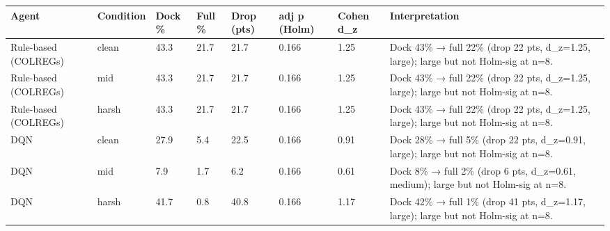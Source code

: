 \begin{tabular}{llllllll}
\toprule
Agent & Condition & Dock \% & Full \% & Drop (pts) & adj p (Holm) & Cohen d\_z & Interpretation \\
\midrule
Rule-based (COLREGs) & clean & 43.3 & 21.7 & 21.7 & 0.166 & 1.25 & Dock 43\% → full 22\% (drop 22 pts, d\_z=1.25, large); large but not Holm-sig at n=8. \\
Rule-based (COLREGs) & mid & 43.3 & 21.7 & 21.7 & 0.166 & 1.25 & Dock 43\% → full 22\% (drop 22 pts, d\_z=1.25, large); large but not Holm-sig at n=8. \\
Rule-based (COLREGs) & harsh & 43.3 & 21.7 & 21.7 & 0.166 & 1.25 & Dock 43\% → full 22\% (drop 22 pts, d\_z=1.25, large); large but not Holm-sig at n=8. \\
DQN & clean & 27.9 & 5.4 & 22.5 & 0.166 & 0.91 & Dock 28\% → full 5\% (drop 22 pts, d\_z=0.91, large); large but not Holm-sig at n=8. \\
DQN & mid & 7.9 & 1.7 & 6.2 & 0.166 & 0.61 & Dock 8\% → full 2\% (drop 6 pts, d\_z=0.61, medium); large but not Holm-sig at n=8. \\
DQN & harsh & 41.7 & 0.8 & 40.8 & 0.166 & 1.17 & Dock 42\% → full 1\% (drop 41 pts, d\_z=1.17, large); large but not Holm-sig at n=8. \\
\bottomrule
\end{tabular}

